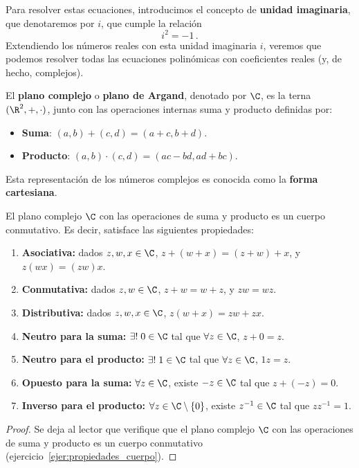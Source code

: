 Para resolver estas ecuaciones, introducimos el concepto de \textbf{unidad imaginaria}, que denotaremos por $i$, que cumple la relación
\[ i^2 = -1\,. \]
Extendiendo los números reales con esta unidad imaginaria $i$, veremos que podemos resolver todas las ecuaciones polinómicas con coeficientes reales (y, de hecho, complejos).

\begin{defi}
  El \textbf{plano complejo} o \textbf{plano de Argand}, denotado por $\C$, es la terna $(\R^2,+,\cdot)$, junto con las operaciones internas suma y producto definidas por:
  \begin{itemize}
    \item \textbf{Suma}: $(a,b) + (c,d) = (a+c,b+d)$.
    \item \textbf{Producto}: $(a,b)\cdot(c,d) = (ac-bd,ad+bc)$.
  \end{itemize}
\end{defi}

Esta representación de los números complejos es conocida como la \textbf{forma cartesiana}.

\begin{prop}
  \label{prop:propiedades_cuerpo}
  El plano complejo $\C$ con las operaciones de suma y producto es un cuerpo conmutativo. Es decir, satisface las siguientes propiedades:
  \begin{enumerate}
    \item[\likeitem{C1}] \textbf{Asociativa:} dados $z,w,x\in\C$, $z+(w+x) = (z+w)+x$, y $z(wx) = (zw)x$.
    \item[\likeitem{C2}] \textbf{Conmutativa:} dados $z,w\in\C$, $z+w = w+z$, y $zw = wz$.
    \item[\likeitem{C3}] \textbf{Distributiva:} dados $z,w,x\in\C$, $z(w+x) = zw + zx$.
    \item[\likeitem{C4}] \textbf{Neutro para la suma:} $\exists!\; 0\in\C$ tal que $\forall z\in\C$, $z+0 = z$.
    \item[\likeitem{C5}] \textbf{Neutro para el producto:} $\exists!\; 1\in\C$ tal que $\forall z\in\C$, $1z = z$.
    \item[\likeitem{C6}] \textbf{Opuesto para la suma:} $\forall z\in\C$, existe $-z\in\C$ tal que $z+(-z) = 0$.
    \item[\likeitem{C7}] \textbf{Inverso para el producto:} $\forall z\in\C\setminus\{0\}$, existe $z^{-1}\in\C$ tal que $zz^{-1} = 1$.
  \end{enumerate}
\end{prop}
\begin{proof}
  Se deja al lector que verifique que el plano complejo $\C$ con las operaciones de suma y producto es un cuerpo conmutativo (ejercicio~\ref{ejer:propiedades_cuerpo}).
\end{proof}

